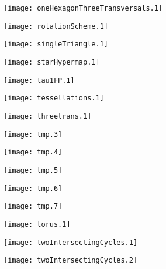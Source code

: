 \documentclass[12pt,a4paper,amstags,fleqn,reqno]{article}
\begin{document}
\begin{center} \texttt{[image: oneHexagonThreeTransversals.1]} \end{center}
\begin{center} \texttt{[image: rotationScheme.1]} \end{center}
\begin{center} \texttt{[image: singleTriangle.1]} \end{center}
\begin{center} \texttt{[image: starHypermap.1]} \end{center}
\begin{center} \texttt{[image: tau1FP.1]} \end{center}
\begin{center} \texttt{[image: tessellations.1]} \end{center}
\begin{center} \texttt{[image: threetrans.1]} \end{center}
\begin{center} \texttt{[image: tmp.3]} \end{center}
\begin{center} \texttt{[image: tmp.4]} \end{center}
\begin{center} \texttt{[image: tmp.5]} \end{center}
\begin{center} \texttt{[image: tmp.6]} \end{center}
\begin{center} \texttt{[image: tmp.7]} \end{center}
\begin{center} \texttt{[image: torus.1]} \end{center}
\begin{center} \texttt{[image: twoIntersectingCycles.1]} \end{center}
\begin{center} \texttt{[image: twoIntersectingCycles.2]} \end{center}
\end{document}

